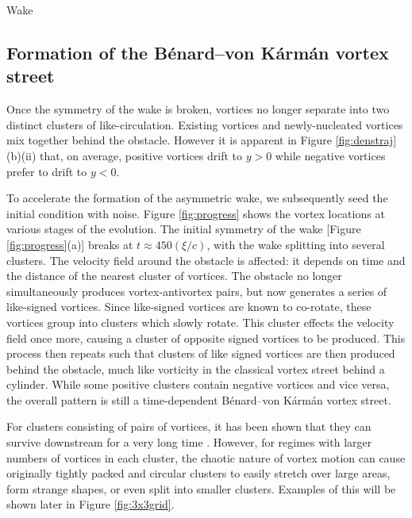\begin{chapter}{\label{cha:wake}Wake}
\subsection{Formation of the B\'enard--von K\'arm\'an vortex street}
Once the symmetry of the wake is broken, vortices no longer separate into two distinct clusters of like-circulation. Existing vortices and newly-nucleated vortices mix together behind the obstacle. However it is apparent in Figure \ref{fig:denstraj}(b)(ii) that, on average, positive vortices drift to $y>0$ while negative vortices prefer to drift to $y<0$. 

To accelerate the formation of the asymmetric wake, we subsequently seed the initial condition with noise.  Figure \ref{fig:progress} shows the vortex locations at various stages of the evolution. The initial symmetry of the wake [Figure \ref{fig:progress}(a)] breaks at $t \approx 450 (\xi/c)$, with the wake splitting into several clusters. The velocity field around the obstacle is affected: it depends on time and the distance of the nearest cluster of vortices. The obstacle no longer simultaneously produces vortex-antivortex pairs, but now generates a series of like-signed vortices.  Since like-signed vortices are known to co-rotate, these vortices group into clusters which slowly rotate.  This cluster effects the velocity field once more, causing a cluster of opposite signed vortices to be produced. This process then repeats such that clusters of like signed vortices are then produced behind the obstacle, much like vorticity in the classical vortex street behind a cylinder.  While some positive clusters contain negative vortices and vice versa, the overall pattern is still a time-dependent B\'enard--von K\'arm\'an vortex street.

For clusters consisting of pairs of vortices, it has been shown that they can survive downstream for a very long time \cite{saito10}.  However, for regimes with larger numbers of vortices in each cluster, the chaotic nature of vortex motion can cause originally tightly packed and circular clusters to easily stretch over large areas, form strange shapes, or even split into smaller clusters. Examples of this will be shown later in Figure \ref{fig:3x3grid}.



\end{chapter}
